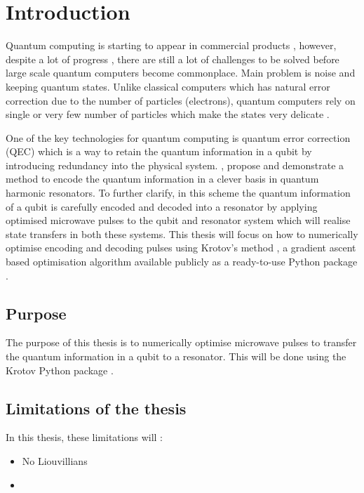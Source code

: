 \documentclass[main.tex]{subfiles}
\begin{document}
\chapter{Introduction}
Quantum computing is starting to appear in commercial products \cite{santos_ibm_2016}, however, despite a lot of progress \cite{preskill_quantum_2018}, there are still a lot of challenges to be solved before large scale quantum computers become commonplace. Main problem is noise and keeping quantum states. Unlike classical computers which has natural error correction due to the number of particles (electrons), quantum computers rely on single or very few number of particles which make the states very delicate \cite{gottesman_introduction_2009}.

One of the key technologies for quantum computing is quantum error correction (QEC) \cite{gottesman_introduction_2009} which is a way to retain the quantum information in a qubit by introducing redundancy into the physical system. \citeauthor{leghtas_hardware-efficient_2013} \cite{leghtas_hardware-efficient_2013}, \citeauthor{mirrahimi_dynamically_2014} \cite{mirrahimi_dynamically_2014} propose and \citeauthor{ofek_extending_2016} \cite{ofek_extending_2016} demonstrate a method to encode the quantum information in a clever basis in quantum harmonic resonators. To further clarify, in this scheme the quantum information of a qubit is carefully encoded and decoded into a resonator by applying optimised microwave pulses to the qubit and resonator system which will realise state transfers in both these systems. This thesis will focus on how to numerically optimise encoding and decoding pulses using Krotov's method \cite{reich_monotonically_2012}, a gradient ascent based optimisation algorithm available publicly as a ready-to-use Python package \cite{goerz_krotov:_2019}.

\section{Purpose}
The purpose of this thesis is to numerically optimise microwave pulses to transfer the quantum information in a qubit to a resonator. This will be done using the Krotov Python package \cite{goerz_krotov:_2019}. 


\section{Limitations of the thesis}
In this thesis, these limitations will :
\begin{itemize}
    \item No Liouvillians
    \item 
\end{itemize}
\end{document}
